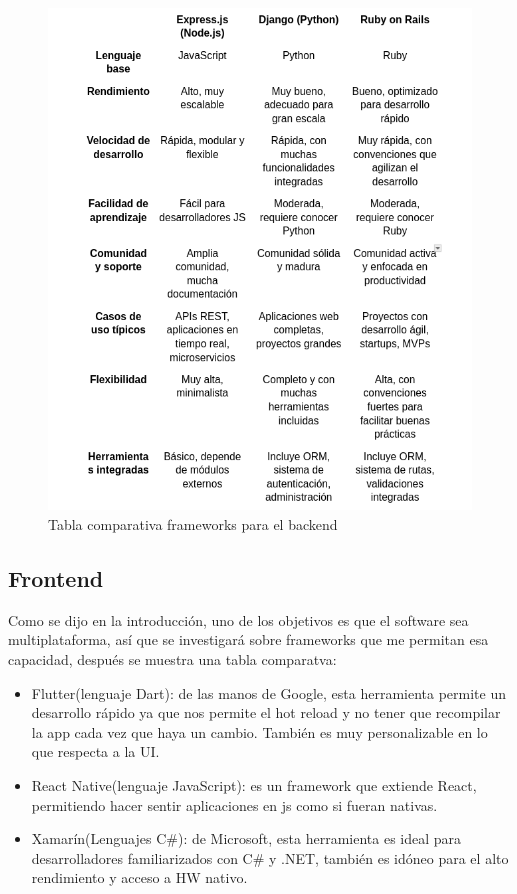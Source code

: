 \newpage

\begin{figure}[H]
   \centering
    \includegraphics[width=\textwidth]{tablas/Backend.png}
    \caption{Tabla comparativa frameworks para el backend}
    \label{fig:Tabla backend}
\end{figure}

\subsection{Frontend}

Como se dijo en la introducción, uno de los objetivos es que el software sea multiplataforma, así que se investigará sobre frameworks que me permitan esa capacidad, después se muestra una tabla comparatva:

\begin{itemize}
	\item Flutter(lenguaje Dart): de las manos de Google, esta herramienta permite un desarrollo rápido ya que nos permite el hot reload y no tener que recompilar la app cada vez que haya un cambio. También es muy personalizable en lo que respecta a la UI.
	\item React Native(lenguaje JavaScript): es un framework que extiende React, permitiendo hacer sentir aplicaciones en js como si fueran nativas.
	\item Xamarín(Lenguajes C\#): de Microsoft, esta herramienta es ideal para desarrolladores familiarizados con C\# y .NET, también es idóneo para el alto rendimiento y acceso a HW nativo.
\end{itemize}

